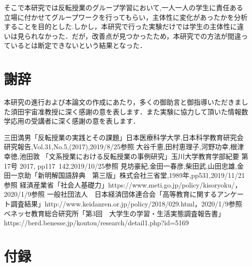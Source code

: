 \documentclass[a4j,11pt]{jsarticle}
\begin{document}
そこで本研究では反転授業のグループ学習において,一人一人の学生に責任ある立場に付かせてグループワークを行ってもらい，主体性に変化があったかを分析することを目的とした.しかし，本研究で行った実験だけでは学生の主体性に違いは見られなかった．だが，改善点が見つかったため，本研究での方法が間違っているとは断定できないという結果となった．


\newpage
\section*{謝辞}
本研究の進行および本論文の作成にあたり，多くの御助言と御指導いただきました須田宇宙准教授に深く感謝の意を表します．また実験に協力して頂いた情報数学応用の受講者に深く感謝の意を表します．
\newpage


\begin{thebibliography}{3}
三田満男「反転授業の実践とその課題」日本医療科学大学,日本科学教育研究会研究報告,Vol.31,No.5,(2017),2019/8/25参照
大谷千恵,田村恵理子,河野功幸,根津幸徳,池田敦 「文系授業における反転授業の事例研究」玉川大学教育学部紀要 第17号 2017, pp117~142,2019/10/25参照
見坊豪紀,金田一春彦,柴田武,山田忠雄,金田一京助「新明解国語辞典　第三版」株式会社三省堂,1989年,pp531,2019/11/21参照
経済産業省「社会人基礎力」https://www.meti.go.jp/policy/kisoryoku/，2020/1/9参照
一般社団法人　日本経済団体連合会「高等教育に関するアンケート調査結果」http://www.keidanren.or.jp/policy/2018/029.html，2020/1/9参照
ベネッセ教育総合研究所「第3回　大学生の学習・生活実態調査報告書」https://berd.benesse.jp/koutou/research/detail1.php?id=5169
\end{thebibliography}

\newpage
\section*{付録}
\end{document}
